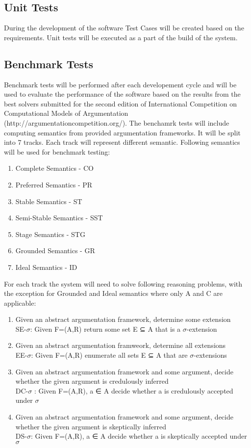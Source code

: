 \subsection{Unit Tests}
During the development of the software Test Cases will be created based on the requirements. Unit tests will be executed as a part of the build of the system. 

\subsection{Benchmark Tests}
Benchmark tests will be performed after each developement cycle and will be used to evaluate the performance of the software based on the results from the best solvers submitted for the second edition of International Competition on Computational Models of Argumentation (http://argumentationcompetition.org/). 
The benchamrk tests will include computing semantics from provided argumentation frameworks. It will be split into 7 tracks. Each track will represent different semantic. Following semantics will be used for benchmark testing:
\begin{enumerate}
	\item{Complete Semantics - CO}
	\item{Preferred Semantics - PR}
	\item{Stable Semantics - ST}
	\item{Semi-Stable Semantics - SST}
	\item{Stage Semantics - STG}
	\item{Grounded Semantics - GR}
	\item{Ideal Semantics - ID}
\end{enumerate}

For each track the system will need to solve following reasoning problems, with the exception for Grounded and Ideal semantics where only A and C are applicable:
\begin{enumerate}[label=\Alph*]
	\item{Given an abstract argumentation framework, determine some extension\\SE-$\sigma$: Given F=(A,R) return some set E ⊆ A that is a $\sigma$-extension}
	\item{Given an abstract argumentation framweork, determine all extensions\\EE-$\sigma$: Given F=(A,R) enumerate all sets E ⊆ A that are $\sigma$-extensions}
	\item{Given an abstract argumentation framework and some argument, decide whether the given argument is credulously inferred\\DC-$\sigma$ : Given F=(A,R), a ∈ A decide whether a is credulously accepted under $\sigma$}
	\item{Given an abstract argumentation framework and some argument, decide whether the given argument is skeptically inferred\\DS-$\sigma$: Given F=(A,R), a ∈ A decide whether a is skeptically accepted under $\sigma$}
\end{enumerate}


